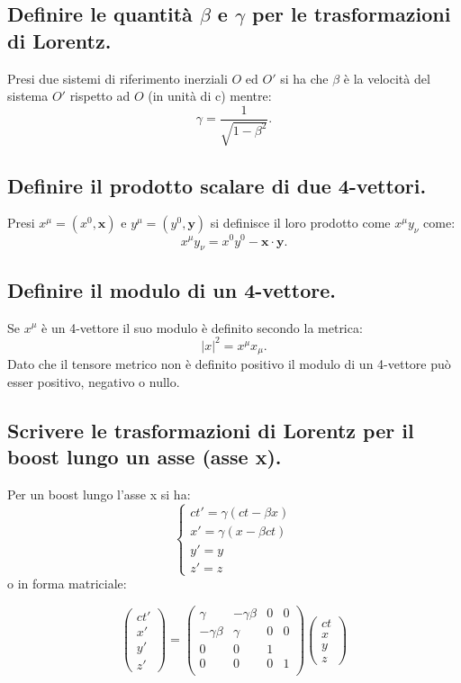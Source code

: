 \subsection[]{ Definire le quantità $\beta$ e $\gamma$ per le trasformazioni di Lorentz.} 
Presi due sistemi di riferimento inerziali $O$ ed $O'$ si ha che $\beta$ è la velocità del sistema $O'$ rispetto ad $O$ (in unità di c) mentre:
\[
	\gamma = \frac{1}{\sqrt{1-\beta^2}}
.\] 

\subsection[]{ Definire il prodotto scalare di due 4-vettori.} 
Presi $x^{\mu} = (x^0,\boldsymbol{x})$ e $y^{\mu} = ( y^0, \boldsymbol{y})$ si definisce il loro prodotto come $x^{\mu}y_{\nu}$ come:
\[
x^{\mu}y_{\nu} = x^{0}y^{0}-\boldsymbol{x} \cdot \boldsymbol{y} 
.\] 
\subsection[]{ Definire il modulo di un 4-vettore.}
Se $x^{\mu}$ è un 4-vettore il suo modulo è definito secondo la metrica:
\[
|x|^2 = x^{\mu}x_{\mu}
.\] 
Dato che il tensore metrico non è definito positivo il modulo di un 4-vettore può esser positivo, negativo o nullo. 
\subsection[]{ Scrivere le trasformazioni di Lorentz per il boost lungo un asse (asse x).}
Per un boost lungo l'asse x si ha:
\[
\begin{cases}
	ct' = \gamma ( ct - \beta x) \\	
	x' = \gamma (x - \beta ct ) \\
	y' = y \\
	z' = z
\end{cases}
\]
o in forma matriciale:

\[
\left( \begin{array}{c} ct' \\ x' \\ y' \\ z' \end{array} \right)
= 
\begin{pmatrix}
	\gamma  & -\gamma \beta  & 0 & 0\\
	- \gamma \beta & \gamma & 0 & 0\\
	0 & 0 & 1 & \\
	0 & 0 & 0 & 1 \\
\end{pmatrix}
\left( \begin{array}{c} ct \\ x \\ y \\ z  \end{array} \right)
\] 

